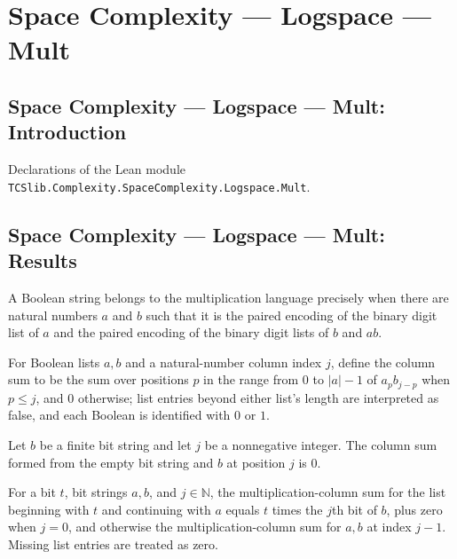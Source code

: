\section{Space Complexity --- Logspace --- Mult}
\subsection*{Space Complexity --- Logspace --- Mult: Introduction}

Declarations of the Lean module \texttt{TCSlib.Complexity.SpaceComplexity.Logspace.Mult}.

\subsection*{Space Complexity --- Logspace --- Mult: Results}

\begin{definition}
\label{Complexity.multLang}
\leanok
{}
A Boolean string belongs to the multiplication language precisely when there are natural
numbers $a$ and $b$ such that it is the paired encoding of the binary digit list of $a$
and the paired encoding of the binary digit lists of $b$ and $ab$.
\end{definition}

\begin{definition}
\label{Complexity.multColumn}
\leanok
For Boolean lists $a,b$ and a natural-number column index $j$, define the column sum to
be the sum over positions $p$ in the range from $0$ to $|a|-1$ of $a_p b_{j-p}$ when
$p\le j$, and $0$ otherwise; list entries beyond either list's length are interpreted as
false, and each Boolean is identified with $0$ or $1$.
\end{definition}

\begin{lemma}
\label{Complexity.multColumn_nil}
\leanok
{}
Let $b$ be a finite bit string and let $j$ be a nonnegative integer. The column sum
formed from the empty bit string and $b$ at position $j$ is $0$.
\end{lemma}

\begin{lemma}
\label{Complexity.multColumn_cons}
\leanok
{}
For a bit $t$, bit strings $a,b$, and $j\in\mathbb{N}$, the multiplication-column sum
for the list beginning with $t$ and continuing with $a$ equals $t$ times the $j$th bit
of $b$, plus zero when $j=0$, and otherwise the multiplication-column sum for $a,b$ at
index $j-1$. Missing list entries are treated as zero.
\end{lemma}

